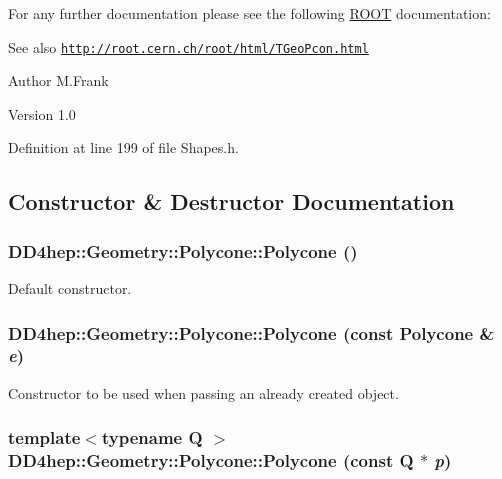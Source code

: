 For any further documentation please see the following \hyperlink{namespace_r_o_o_t}{ROOT} documentation: \begin{DoxySeeAlso}{See also}
\href{http://root.cern.ch/root/html/TGeoPcon.html}{\tt http://root.cern.ch/root/html/TGeoPcon.html}
\end{DoxySeeAlso}
\begin{DoxyAuthor}{Author}
M.Frank 
\end{DoxyAuthor}
\begin{DoxyVersion}{Version}
1.0 
\end{DoxyVersion}


Definition at line 199 of file Shapes.h.

\subsection{Constructor \& Destructor Documentation}
\hypertarget{class_d_d4hep_1_1_geometry_1_1_polycone_a0946449c311d2cfdb9381e9dd975f6e9}{
\subsubsection[{Polycone}]{\setlength{\rightskip}{0pt plus 5cm}DD4hep::Geometry::Polycone::Polycone ()}}
\label{class_d_d4hep_1_1_geometry_1_1_polycone_a0946449c311d2cfdb9381e9dd975f6e9}


Default constructor. \hypertarget{class_d_d4hep_1_1_geometry_1_1_polycone_adf0ec9439b0bd1a4a2d12e51d0885ba0}{
\subsubsection[{Polycone}]{\setlength{\rightskip}{0pt plus 5cm}DD4hep::Geometry::Polycone::Polycone (const {\bf Polycone} \& {\em e})}}
\label{class_d_d4hep_1_1_geometry_1_1_polycone_adf0ec9439b0bd1a4a2d12e51d0885ba0}


Constructor to be used when passing an already created object. \hypertarget{class_d_d4hep_1_1_geometry_1_1_polycone_add60214e19fc5def3c76007c602517d7}{
\subsubsection[{Polycone}]{\setlength{\rightskip}{0pt plus 5cm}template$<$typename Q $>$ DD4hep::Geometry::Polycone::Polycone (const Q $\ast$ {\em p})}}
\label{class_d_d4hep_1_1_geometry_1_1_polycone_add60214e19fc5def3c76007c602517d7}


